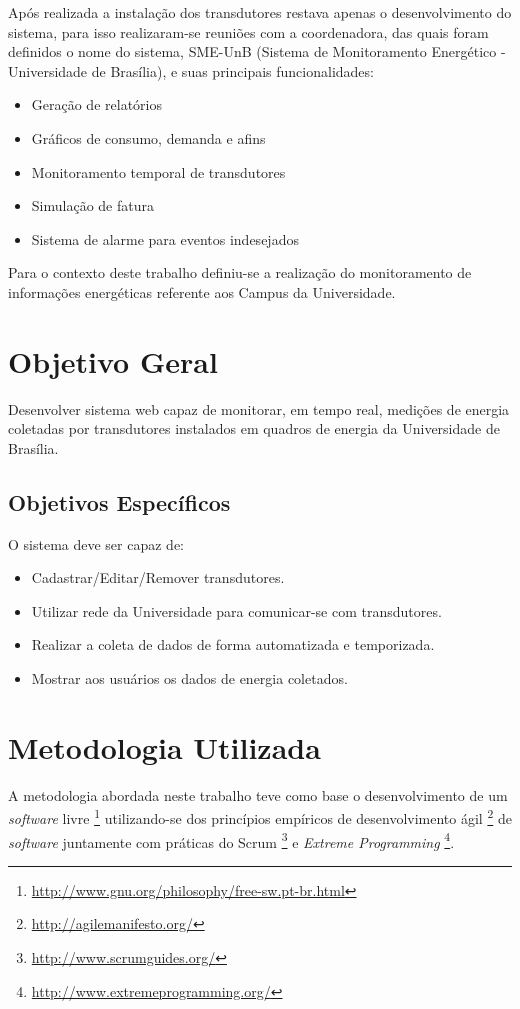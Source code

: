 Após realizada a instalação dos transdutores restava apenas o desenvolvimento do sistema, para isso realizaram-se reuniões com a coordenadora, das quais foram definidos o nome do sistema, SME-UnB (Sistema de Monitoramento Energético - Universidade de Brasília), e suas principais funcionalidades:
\begin{itemize}
    \item Geração de relatórios
    \item Gráficos de consumo, demanda e afins
    \item Monitoramento temporal de transdutores
    \item Simulação de fatura
    \item Sistema de alarme para eventos indesejados
\end{itemize}

Para o contexto deste trabalho definiu-se a realização do monitoramento de informações energéticas referente aos Campus da Universidade.

\section{Objetivo Geral}
Desenvolver sistema web capaz de monitorar, em tempo real, medições de energia coletadas por transdutores
instalados em quadros de energia da Universidade de Brasília.

\subsection{Objetivos Específicos}
O sistema deve ser capaz de:
\begin{itemize}
    \item Cadastrar/Editar/Remover transdutores.
    \item Utilizar rede da Universidade para comunicar-se com transdutores.
    \item Realizar a coleta de dados de forma automatizada e temporizada.
    \item Mostrar aos usuários os dados de energia coletados.
\end{itemize}

\section{Metodologia Utilizada}
A metodologia abordada neste trabalho teve como base o desenvolvimento de um \textit{software} livre \footnote{\url{http://www.gnu.org/philosophy/free-sw.pt-br.html}} utilizando-se dos princípios empíricos de desenvolvimento ágil \footnote{\url{http://agilemanifesto.org/}} de \textit{software} juntamente com práticas do Scrum \footnote{\url{http://www.scrumguides.org/}} e \textit{Extreme Programming} \footnote{\url{http://www.extremeprogramming.org/}}.

